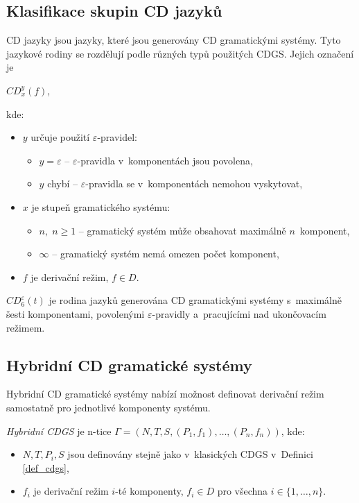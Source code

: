 \subsection*{Klasifikace skupin CD jazyků}
CD jazyky jsou jazyky, které jsou generovány CD gramatickými systémy.
Tyto jazykové rodiny se rozdělují podle různých typů použitých CDGS.
Jejich označení je
\begin{center}
    $CD^y_x(f)$,
\end{center}
kde:
\begin{itemize}
    \item $y$ určuje použití $\varepsilon$-pravidel: 
    \begin{itemize}[label=$\circ$]
        \item $y = \varepsilon$ -- $\varepsilon$-pravidla v~komponentách jsou povolena,
        \item $y$ chybí -- $\varepsilon$-pravidla se v~komponentách nemohou vyskytovat,
    \end{itemize}
    \item $x$ je stupeň gramatického systému:
    \begin{itemize}[label=$\circ$]
        \item $n,\; n \geq 1$ -- gramatický systém může obsahovat maximálně $n$~komponent,
        \item $\infty$ -- gramatický systém nemá omezen počet komponent,
    \end{itemize}
    \item $f$ je derivační režim, $f \in D$.
\end{itemize}
\begin{example}
    $CD^\varepsilon_6 (t)$ je rodina jazyků generována CD gramatickými systémy s~maximálně šesti komponentami, povolenými $\varepsilon$-pravidly a~pracujícími nad ukončovacím režimem. 
\end{example}

\subsection*{Hybridní CD gramatické systémy}
Hybridní CD gramatické systémy nabízí možnost definovat derivační režim samostatně pro jednotlivé komponenty systému.
\begin{definition}
    \emph{Hybridní CDGS} je n-tice $\Gamma = (N, T, S, (P_1, f_1), \ldots, (P_n, f_n))$, kde:
    \begin{itemize}
        \item $N, T, P_i, S$ jsou definovány stejně jako v~klasických CDGS v~Definici \ref{def_cdgs},
        \item $f_i$ je derivační režim $i$-té komponenty, $f_i \in D$ pro všechna $i \in \{1, \ldots, n\}$.
    \end{itemize}
\end{definition}

